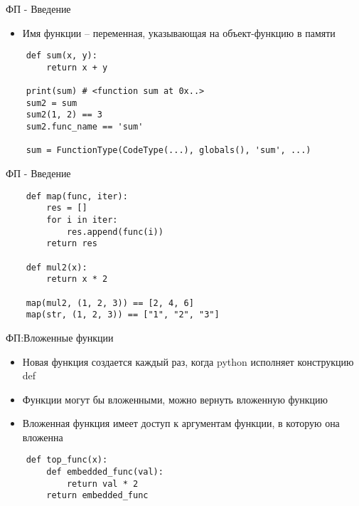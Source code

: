 \documentclass{article}
\begin{document}
\begin{center} ФП - Введение \end{center}
\begin{itemize}
    \item Имя функции – переменная, указывающая на объект-функцию в памяти
\end{itemize}
\vspace{15pt}
\begin{lstlisting}
    def sum(x, y):
        return x + y

    print(sum) # <function sum at 0x..>
    sum2 = sum
    sum2(1, 2) == 3
    sum2.func_name == 'sum'

    sum = FunctionType(CodeType(...), globals(), 'sum', ...)
\end{lstlisting}
\newpage

\begin{center} ФП - Введение \end{center}
\vspace{15pt}
\begin{lstlisting}
    def map(func, iter):
        res = []
        for i in iter:
            res.append(func(i))
        return res

    def mul2(x):
        return x * 2

    map(mul2, (1, 2, 3)) == [2, 4, 6]
    map(str, (1, 2, 3)) == ["1", "2", "3"]
\end{lstlisting}
\newpage

\begin{center} ФП:Вложенные функции \end{center}
\begin{itemize}
    \item Новая функция создается каждый раз, когда python исполняет конструкцию def
    \item Функции могут бы вложенными, можно вернуть вложенную функцию
    \item Вложенная функция имеет доступ к аргументам функции, в которую она вложенна
\end{itemize}
\vspace{15pt}
\begin{lstlisting}
    def top_func(x):
        def embedded_func(val):
            return val * 2
        return embedded_func
\end{lstlisting}
\newpage
\end{document}
